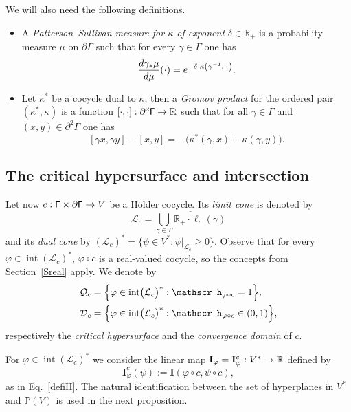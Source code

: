 \documentclass[AHL,Unicode,longabstracts,MathTools]{cedram}
\DeclareMathOperator{\inte}{int}
\newcommand{\scr}{\mathscr}
\newcommand{\hJ}[1]{{\scr h}_{#1}}
\renewcommand{\sf}[1]{{\mathsf{#1}}}
\newcommand{\G}{\sf{\Gamma}}
\newcommand{\cal}{\mathcal}
\newcommand{\calL}{\mathcal{L}}
\newcommand{\calQ}{\mathcal{Q}}
\newcommand{\R}{\mathbb{R}}
\renewcommand{\P}{\mathbb{P}}
\newcommand{\II}{\mathbf{I}}
\newcommand{\g}{\gamma}
\newcommand{\bord}{\partial}
\newcommand{\ps}{\mu}
\renewcommand{\/}{\backslash}
\newcommand{\<}{\langle}
\renewcommand{\>}{\rangle}
\newcommand{\cdc}[1]{\bigl(\calL_{#1}\bigr)^*}
\renewcommand*{\to}{\mathchoice{\longrightarrow}{\rightarrow}{\rightarrow}{\rightarrow}}
\let\originalleft\left
\let\originalright\right
\renewcommand{\left}{\mathopen{}\mathclose\bgroup\originalleft}
\renewcommand{\right}{\aftergroup\egroup\originalright}
\begin{document}
We will also need the following definitions.

\begin{defi}\leavevmode
\begin{itemize}
\item A \emph{Patterson--Sullivan measure for $\kappa$ of exponent} $\delta\in\R_+$ is a probability measure $\ps$ on $\bord\G$ such that for every $\g\in\G$ one has
\begin{equation}\label{defP}
\frac{d \g_*\ps}{d\ps}(\cdot)=e^{-\delta\cdot \kappa\left(\g^{-1},\,\cdot\,\right)}.
\end{equation}
\item Let $\kappa^*$ be a cocycle dual to $\kappa$, then a \emph{Gromov product} for the ordered pair $(\kappa^*, \kappa)$ is a function $[\cdot,\cdot]:\bord^2\G\to\R$ such that for all $\g\in\G$ and $(x,y)\in\bord^2\G$ one has
\[
[\g x,\g y]-[x,y]=-\bigl(\kappa^*(\g,x)+\kappa(\g,y)\bigr).
\]
\end{itemize}
\end{defi}



\subsection{The critical hypersurface and intersection}\label{QQ}

Let now $c:\G\times\bord\G\to V$ be a H\"older cocycle. Its \emph{limit cone} is denoted by
\[
\calL_c=\overline{\bigcup_{\g\in\G}\R_+\cdot\ell_c(\g)}
\]
and its \emph{dual cone} by $(\calL_c)^*=\{\psi\in V^*:\psi|_{\calL_c}\geq0\}$. Observe that for every $\varphi\in\inte(\calL_c)^*$, $\varphi\circ c$ is a real-valued cocycle, so the concepts from Section~\ref{Sreal} apply. We denote by
\begin{alignat}{2}\label{qh1}
\calQ_c & =\left\{\varphi\in\inte\cdc{c}:\hJ{\varphi\circ c}=1\right\},\\
\cal D_c & = \left\{\varphi\in\inte\cdc{c}:\hJ{\varphi\circ c}\in(0,1)\right\},
\end{alignat}
respectively the \emph{critical hypersurface} and the \emph{convergence domain} of $c$.

For $\varphi\in\inte(\calL_c)^*$ we consider the linear map $\II_{\varphi}=\II_{\varphi}^c:V^*\to\R$ defined by
\[
\II_{\varphi}^c(\psi):= \II(\varphi\circ c,\psi\circ c),
\]
as in Eq.~\eqref{defiII}. The natural identification between the set of hyperplanes in $V^*$ and $\P(V)$ is used in the next proposition.
\end{document}

